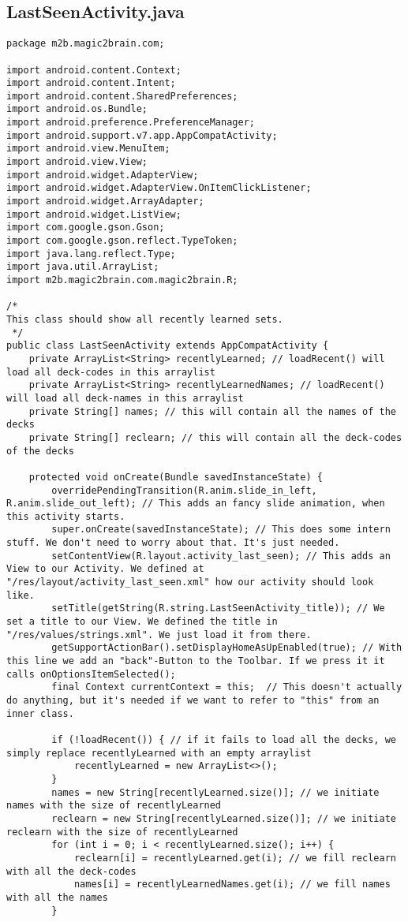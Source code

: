 \subsection{LastSeenActivity.java}
\begin{lstlisting}
package m2b.magic2brain.com;

import android.content.Context;
import android.content.Intent;
import android.content.SharedPreferences;
import android.os.Bundle;
import android.preference.PreferenceManager;
import android.support.v7.app.AppCompatActivity;
import android.view.MenuItem;
import android.view.View;
import android.widget.AdapterView;
import android.widget.AdapterView.OnItemClickListener;
import android.widget.ArrayAdapter;
import android.widget.ListView;
import com.google.gson.Gson;
import com.google.gson.reflect.TypeToken;
import java.lang.reflect.Type;
import java.util.ArrayList;
import m2b.magic2brain.com.magic2brain.R;

/*
This class should show all recently learned sets.
 */
public class LastSeenActivity extends AppCompatActivity {
    private ArrayList<String> recentlyLearned; // loadRecent() will load all deck-codes in this arraylist
    private ArrayList<String> recentlyLearnedNames; // loadRecent() will load all deck-names in this arraylist
    private String[] names; // this will contain all the names of the decks
    private String[] reclearn; // this will contain all the deck-codes of the decks

    protected void onCreate(Bundle savedInstanceState) {
        overridePendingTransition(R.anim.slide_in_left, R.anim.slide_out_left); // This adds an fancy slide animation, when this activity starts.
        super.onCreate(savedInstanceState); // This does some intern stuff. We don't need to worry about that. It's just needed.
        setContentView(R.layout.activity_last_seen); // This adds an View to our Activity. We defined at "/res/layout/activity_last_seen.xml" how our activity should look like.
        setTitle(getString(R.string.LastSeenActivity_title)); // We set a title to our View. We defined the title in "/res/values/strings.xml". We just load it from there.
        getSupportActionBar().setDisplayHomeAsUpEnabled(true); // With this line we add an "back"-Button to the Toolbar. If we press it it calls onOptionsItemSelected();
        final Context currentContext = this;  // This doesn't actually do anything, but it's needed if we want to refer to "this" from an inner class.

        if (!loadRecent()) { // if it fails to load all the decks, we simply replace recentlyLearned with an empty arraylist
            recentlyLearned = new ArrayList<>();
        }
        names = new String[recentlyLearned.size()]; // we initiate names with the size of recentlyLearned
        reclearn = new String[recentlyLearned.size()]; // we initiate reclearn with the size of recentlyLearned
        for (int i = 0; i < recentlyLearned.size(); i++) {
            reclearn[i] = recentlyLearned.get(i); // we fill reclearn with all the deck-codes
            names[i] = recentlyLearnedNames.get(i); // we fill names with all the names
        }


\end{lstlisting}
